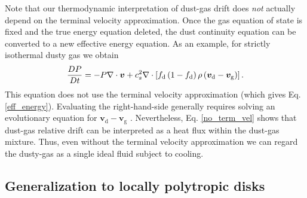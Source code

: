 {%

Note that our thermodynamic interpretation of dust-gas drift does
\emph{not} actually depend on the terminal velocity approximation.   
Once the gas equation of state is fixed and the true energy equation deleted, 
the dust continuity equation can be converted to a new effective energy equation. 
As an example, for strictly isothermal dusty gas we obtain   
\begin{align}
\frac{DP}{Dt} = - P\nabla\cdot\bm{v} +
c_s^2\nabla\cdot\left[f_\mathrm{d}\left(1-f_\mathrm{d}\right)\rho\left(\bm{v}_\mathrm{d}
    - \bm{v}_\mathrm{g}\right)\right]. \label{no_term_vel}  
\end{align}
This equation does not use
the terminal velocity approximation (which gives
Eq. \ref{eff_energy}). Evaluating the right-hand-side generally 
requires solving an evolutionary equation for $\bm{v}_\mathrm{d} - 
\bm{v}_\mathrm{g}$ \citep{laibe14}. Nevertheless,
Eq. \ref{no_term_vel} shows that dust-gas relative drift can be
interpreted as a heat flux within the dust-gas mixture. Thus, even 
without the terminal velocity approximation we can 
regard the dusty-gas as a single ideal fluid subject to cooling.   
}

\subsection{Generalization to locally polytropic disks}\label{gen_poly}

